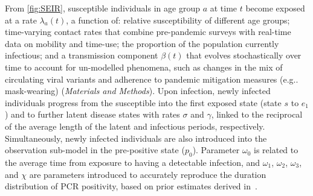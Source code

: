 \documentclass[9pt,twocolumn,twoside]{pnas-new}
\makeatletter
\DeclareRobustCommand\onedot{\futurelet\@let@token\@onedot}
\def\@onedot{\ifx\@let@token.\else.\null\fi\xspace}
\def\eg{e.g\onedot} \def\Eg{{E.g}\onedot}
\makeatother
\begin{document}
From \cref{fig:SEIR}, susceptible individuals in age group $a$ at time $t$ become exposed at a rate $\lambda_a(t)$, a function of: relative susceptibility of different age groups; time-varying contact rates that combine pre-pandemic surveys with real-time data on mobility and time-use; the proportion of the population currently infectious; and a transmission component $\beta(t)$ that evolves stochastically over time to account for un-modelled phenomena, such as changes in the mix of circulating viral variants and adherence to pandemic mitigation measures (\eg mask-wearing) (\textit{Materials and Methods}).
Upon infection, newly infected individuals progress from the susceptible into the first exposed state (state $s$ to $e_1$) and to further latent disease states with rates $\sigma$ and $\gamma$, linked to the reciprocal of the average length of the latent and infectious periods, respectively. 
Simultaneously, newly infected individuals are also introduced into the observation sub-model in the pre-positive state ($p_0$).
Parameter $\omega_0$ is related to the average time from exposure to having a detectable infection, and $\omega_1$, $\omega_2$, $\omega_3$, and $\chi$ are parameters introduced to accurately reproduce the duration distribution of PCR positivity, based on prior estimates derived in~\citep{blakeDuration}.
\end{document}
